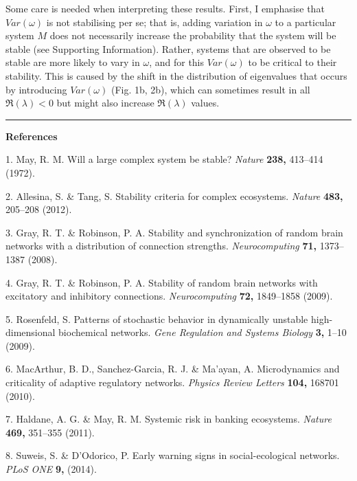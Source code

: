 \documentclass[]{article}
\begin{document}
Some care is needed when interpreting these results. First, I emphasise
that \(Var(\omega)\) is not stabilising per se; that is, adding
variation in \(\omega\) to a particular system \(M\) does not
necessarily increase the probability that the system will be stable (see
Supporting Information). Rather, systems that are observed to be stable
are more likely to vary in \(\omega\), and for this \(Var(\omega)\) to
be critical to their stability. This is caused by the shift in the
distribution of eigenvalues that occurs by introducing \(Var(\omega)\)
(Fig. 1b, 2b), which can sometimes result in all \(\Re(\lambda) < 0\)
but might also increase \(\Re(\lambda)\) values.

\begin{center}\rule{0.5\linewidth}{\linethickness}\end{center}

\textbf{References}

\hypertarget{refs}{}
\hypertarget{ref-May1972}{}
1. May, R. M. Will a large complex system be stable? \emph{Nature}
\textbf{238,} 413--414 (1972).

\hypertarget{ref-Allesina2012}{}
2. Allesina, S. \& Tang, S. Stability criteria for complex ecosystems.
\emph{Nature} \textbf{483,} 205--208 (2012).

\hypertarget{ref-Gray2008}{}
3. Gray, R. T. \& Robinson, P. A. Stability and synchronization of
random brain networks with a distribution of connection strengths.
\emph{Neurocomputing} \textbf{71,} 1373--1387 (2008).

\hypertarget{ref-Gray2009}{}
4. Gray, R. T. \& Robinson, P. A. Stability of random brain networks
with excitatory and inhibitory connections. \emph{Neurocomputing}
\textbf{72,} 1849--1858 (2009).

\hypertarget{ref-Rosenfeld2009}{}
5. Rosenfeld, S. Patterns of stochastic behavior in dynamically unstable
high-dimensional biochemical networks. \emph{Gene Regulation and Systems
Biology} \textbf{3,} 1--10 (2009).

\hypertarget{ref-MacArthur2010}{}
6. MacArthur, B. D., Sanchez-Garcia, R. J. \& Ma'ayan, A. Microdynamics
and criticality of adaptive regulatory networks. \emph{Physics Review
Letters} \textbf{104,} 168701 (2010).

\hypertarget{ref-Haldane2011}{}
7. Haldane, A. G. \& May, R. M. Systemic risk in banking ecosystems.
\emph{Nature} \textbf{469,} 351--355 (2011).

\hypertarget{ref-Suweis2014}{}
8. Suweis, S. \& D'Odorico, P. Early warning signs in social-ecological
networks. \emph{PLoS ONE} \textbf{9,} (2014).
\end{document}
